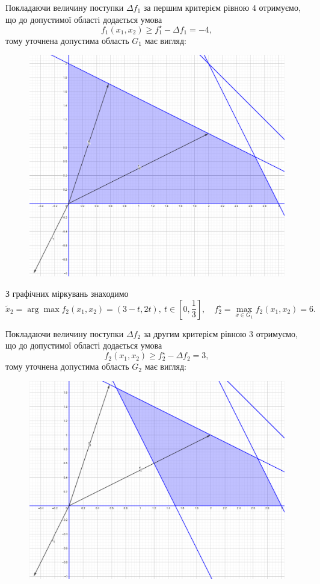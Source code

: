 \begin{solution}
    Покладаючи величину поступки $\Delta f_1$ за першим критерієм рівною $4$ отримуємо, що до допустимої області додається умова \[ f_1(x_1, x_2) \ge f_1^\star - \Delta f_1 = -4, \] тому уточнена допустима область $G_1$ має вигляд:
    \begin{figure}[H]
        \centering
        \includegraphics[width=\textwidth]{img/successive_concessions_2_2.png}
    \end{figure}

    З графічних міркувань знаходимо \[ \tilde x_2 = \arg \max f_2(x_1, x_2) = (3 - t, 2 t), \ t \in \left[0, \frac13\right], \quad f_2^\star = \max_{x \in G_1} f_2(x_1, x_2) = 6. \]

    Покладаючи величину поступки $\Delta f_2$ за другим критерієм рівною $3$ отримуємо, що до допустимої області додається умова \[ f_2(x_1, x_2) \ge f_2^\star - \Delta f_2 = 3, \] тому уточнена допустима область $G_2$ має вигляд:
    \begin{figure}[H]
        \centering
        \includegraphics[width=\textwidth]{img/successive_concessions_2_3.png}
    \end{figure}


\end{solution}
